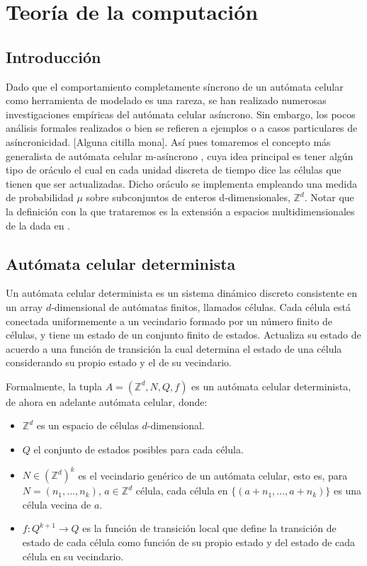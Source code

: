 \documentclass[../proyecto.tex]{memoir}
\begin{document}
\section{Teoría de la computación}

\subsection{Introducción}
Dado que el comportamiento completamente síncrono de un autómata celular como herramienta de modelado es una rareza, se han realizado numerosas investigaciones empíricas del autómata celular asíncrono. Sin embargo, los pocos análisis formales realizados o bien se refieren a ejemplos o a casos particulares de asíncronicidad. [Alguna citilla mona]. Así pues tomaremos el concepto más generalista de autómata celular m-asíncrono \cite{oraculo}, cuya idea principal es tener algún tipo de oráculo el cual en cada unidad discreta de tiempo dice las células que tienen que ser actualizadas. Dicho oráculo se implementa empleando una medida de probabilidad $\mu$ sobre subconjuntos de enteros d-dimensionales, $\mathds{Z}^{d}$. Notar que la definición con la que trataremos es la extensión a espacios multidimensionales de la dada en \cite{oraculo}.

\subsection{Autómata celular determinista}
Un autómata celular determinista es un sistema dinámico discreto consistente en un array $d$-dimensional de autómatas finitos, llamados células. Cada célula está conectada uniformemente a un vecindario formado por un número finito de células, y tiene un estado de un conjunto finito de estados. Actualiza su estado de acuerdo a una función de transición la cual determina el estado de una célula considerando su propio estado y el de su vecindario. 

\begin{defi}
Formalmente, la tupla $A=(\mathds{Z}^{d}, N, Q, f)$ es un autómata celular determinista, de ahora en adelante autómata celular, donde:

\begin{itemize}
\item $\mathds{Z} ^{d}$ es un espacio de células $d$-dimensional.
\item $Q$ el conjunto de estados posibles para cada célula.
\item $N \in (\mathds{Z}^{d})^{k}$ es el vecindario genérico de un autómata celular, esto es, para $N=(n_{1},...,n_{k})$, $a \in \mathds{Z} ^{d}$ célula, cada célula en $\{(a+n_{1},...,a+n_{k})\}$ es una célula vecina de $a$.
\item $f:Q^{k+1} \rightarrow Q$ es la función de transición local que define la transición de estado de cada célula como función de su propio estado y del estado de cada célula en su vecindario. 
\end{itemize}

\end{defi}
\end{document}
